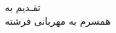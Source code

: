 \clearpage
\thispagestyle{empty}

{\BZarScaleOne
{\fontsize{28pt}{0}\selectfont
\noindent
تقـدیم به
\\[1cm]
\hspace*{1cm}
همسرم به مهربانی فرشته
}}
		
\restoregeometry